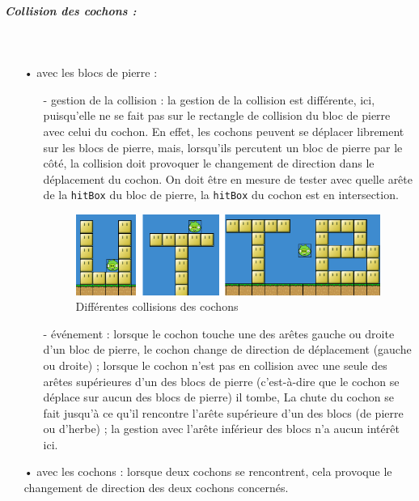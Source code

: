 \documentclass[a4paper,12pt]{report}
\begin{document}
\subparagraph{Collision des cochons :}
~\\
\begin{itemize}
\item[•] avec les blocs de pierre : 
\begin{itemize}
\item[-]gestion de la collision : la gestion de la collision est différente, ici, puisqu'elle ne se fait pas sur le rectangle de collision du bloc de pierre avec celui du cochon. En effet, les cochons peuvent se déplacer librement sur les blocs de pierre, mais, lorsqu'ils percutent un bloc de pierre par le côté, la collision doit provoquer le changement de direction dans le déplacement du cochon. On doit être en mesure de tester avec quelle arête de la \verb+hitBox+ du bloc de pierre, la \verb+hitBox+ du cochon est en intersection.

\begin{figure}[H]
\begin{center}
\includegraphics[scale=0.4]{images/collisionscochons.png} 
\end{center}
\caption{Différentes collisions des cochons}
\label{Différentes collisions des cochons}
\end{figure}

\item[-]événement : lorsque le cochon touche une des arêtes gauche ou droite d'un bloc de pierre, le cochon change de direction de déplacement (gauche ou droite) ; lorsque le cochon n'est pas en collision avec une seule des arêtes supérieures d'un des blocs de pierre (c'est-à-dire que le cochon se déplace sur aucun des blocs de pierre) il tombe, La chute du cochon se fait jusqu'à ce qu'il rencontre l'arête supérieure d'un des blocs (de pierre ou d'herbe) ; la gestion avec l’arête inférieur des blocs n'a aucun intérêt ici.
\end{itemize}
\item[•] avec les cochons : lorsque deux cochons se rencontrent, cela provoque le changement de direction des deux cochons concernés.
\end{itemize}
\end{document}
